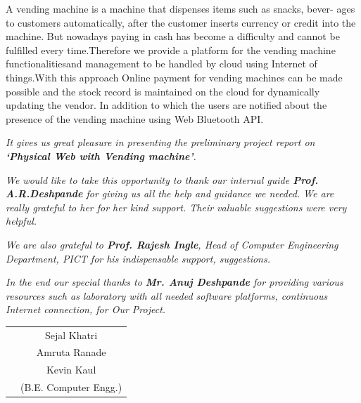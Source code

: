 \documentclass[oneside,a4paper,12pt]{report}
\begin{document}
\newpage

\setcounter{page}{0}
\frontmatter
{}
\rfoot{\thepage}

		
{   \setlength{\parindent}{11mm} }
{ \setlength{\parindent}{0mm} }
 A vending machine is a machine that dispenses items such as snacks, bever-
ages to customers automatically, after the customer inserts currency or credit
into the machine. But nowadays paying in cash has become a difficulty and cannot be fulfilled every time.Therefore we provide a platform for the vending machine functionalitiesand management to be handled by cloud using Internet of things.With this approach Online payment for vending machines can be made possible and the
stock record is maintained on the cloud for dynamically updating the vendor.
In addition to which the users are notified about the presence of the vending
machine using Web Bluetooth API.


{   \setlength{\parindent}{11mm} }
{ \setlength{\parindent}{0mm} }

\textit{It gives us great pleasure in presenting the preliminary project report 
on {\bfseries \fontsize{12}{12} \selectfont `Physical Web with Vending machine'}.}
\vspace*{1.5\baselineskip}

 \textit{We would like to take this opportunity to thank our internal guide
 \textbf{Prof. A.R.Deshpande} for giving us all the help and guidance we needed. We are really grateful to her for her kind support. Their valuable suggestions were very helpful.} \vspace*{1.5\baselineskip}

 \textit{We are also grateful to \textbf{Prof. Rajesh Ingle}, Head of Computer
 Engineering Department, PICT for his indispensable
 support, suggestions.}
\vspace*{1.5\baselineskip}

\textit{In the end our special thanks to \textbf{Mr. Anuj Deshpande} for
providing various resources such as  laboratory with all needed software platforms,
continuous Internet connection, for Our Project.}
\vspace*{3\baselineskip} \\
\begin{tabular}{p{8.2cm}c}
&Sejal Khatri\\
&Amruta Ranade\\
&Kevin Kaul\\
&(B.E. Computer Engg.)
\end{tabular}
\end{document}
